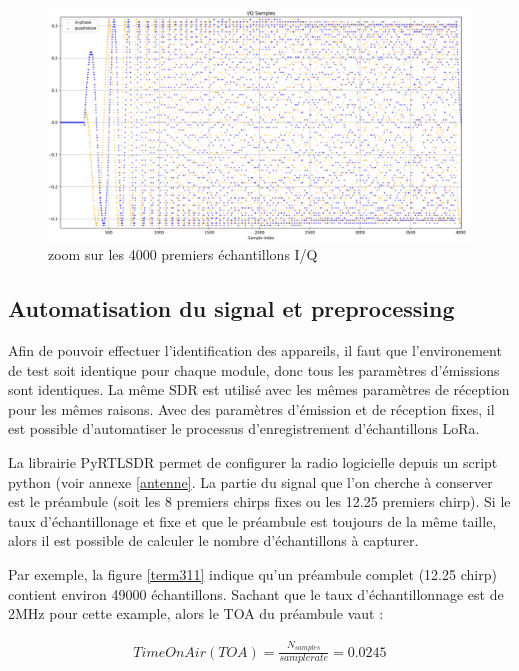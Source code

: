 \newpage

\begin{figure}[h]
\centering

\includegraphics[scale=0.13]{images/iq2.png}
\caption{zoom sur les 4000 premiers échantillons I/Q}\label{term310}
\end{figure}

\subsection{Automatisation du signal et preprocessing}

Afin de pouvoir effectuer l'identification des appareils, il faut que l'environement de test soit identique pour chaque module, donc tous les paramètres d'émissions sont identiques. La même SDR est utilisé avec les mêmes paramètres de réception pour les mêmes raisons. Avec des paramètres d'émission et de réception fixes, il est possible d'automatiser le processus d'enregistrement d'échantillons LoRa.

La librairie PyRTLSDR permet de configurer la radio logicielle depuis un script python (voir annexe \ref{antenne}. La partie du signal que l'on cherche à conserver est le préambule (soit les 8 premiers chirps fixes ou les 12.25 premiers chirp). Si le taux d'échantillonage et fixe et que le préambule est toujours de la même taille, alors il est possible de calculer le nombre d'échantillons à capturer. 

Par exemple, la figure \ref{term311} indique qu'un préambule complet (12.25 chirp) contient environ 49000 échantillons. Sachant que le taux d'échantillonnage est de 2MHz pour cette example, alors le TOA du préambule vaut :

\begin{align}\label{toa}
    Time On Air (TOA) = \frac{N_{samples}}{sample rate} = 0.0245
\end{align}

